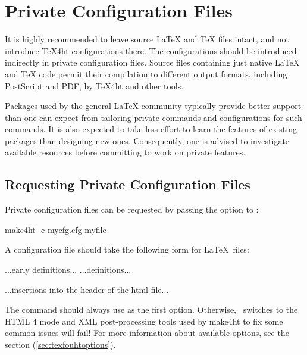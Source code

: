 \section{Private Configuration Files}\label{sec:private-configuration}

It is highly recommended to leave source LaTeX and TeX files intact, and not
introduce TeX4ht configurations there. The configurations should be introduced
indirectly in private configuration files. Source files containing just native
LaTeX and TeX code permit their compilation to different output formats,
including PostScript and PDF, by TeX4ht and other tools.

Packages used by the general LaTeX community typically provide better support
than one can expect from tailoring private commands and configurations for such
commands. It is also expected to take less effort to learn the features of
existing packages than designing new ones. Consequently, one is advised to
investigate available resources before committing to work on private features. 

\subsection{Requesting Private Configuration Files}

Private configuration files can be requested by passing the 
option to :

\begin{shellcommand}
make4ht -c mycfg.cfg myfile 
\end{shellcommand}


A configuration file should take the following form for \LaTeX\ files:

\begin{texsource}
...early definitions...
...definitions...

...insertions into the header of the html file...
\EndPreamble
\end{texsource}

The \texcommand{\Preamble} command should always use  
as the first option. Otherwise, \texfourht\ switches to the HTML 4 mode and XML
post-processing tools used by make4ht to fix some common issues will fail! For 
more information about available options, see the  
section (\ref{sec:texfouhtoptions}).

\begin{texsource}
 
\EndPreamble 
\end{texsource}

